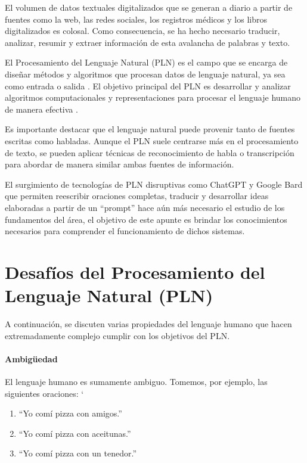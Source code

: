 El volumen de datos textuales digitalizados que se generan a diario a partir de fuentes como la web, las redes sociales, los registros médicos y los libros digitalizados es colosal. Como consecuencia, se ha hecho necesario traducir, analizar, resumir y extraer información de esta avalancha de palabras y texto.

El Procesamiento del Lenguaje Natural (PLN) es el campo que se encarga de diseñar métodos y algoritmos que procesan datos de lenguaje natural, ya sea como entrada o salida \cite{goldberg2017neural}. El objetivo principal del PLN es desarrollar y analizar algoritmos computacionales y representaciones para procesar el lenguaje humano de manera efectiva \cite{jacobbook}.

Es importante destacar que el lenguaje natural puede provenir tanto de fuentes escritas como habladas. Aunque el PLN suele centrarse más en el procesamiento de texto, se pueden aplicar técnicas de reconocimiento de habla o transcripción para abordar de manera similar ambas fuentes de información.

El surgimiento de tecnologías de PLN disruptivas como ChatGPT y Google Bard que permiten reescribir oraciones completas, traducir y desarrollar ideas elaboradas a partir de un ``prompt'' hace aún más necesario el estudio de los fundamentos del área, el objetivo de este apunte es brindar los conocimientos necesarios para comprender el funcionamiento de dichos sistemas.

\section{Desafíos del Procesamiento del Lenguaje Natural (PLN)}

A continuación, se discuten varias propiedades del lenguaje humano que hacen extremadamente complejo cumplir con los objetivos del PLN.

\paragraph{Ambigüedad}

El lenguaje humano es sumamente ambiguo. Tomemos, por ejemplo, las siguientes oraciones:
`
\begin{enumerate}
  \item ``Yo comí pizza con amigos.''
  \item ``Yo comí pizza con aceitunas.''
  \item ``Yo comí pizza con un tenedor.''
\end{enumerate}


